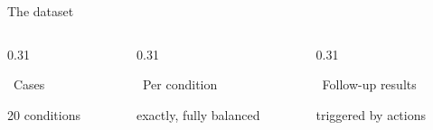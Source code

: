 \documentclass[aspectratio=169,t]{beamer}
\begin{document}
\begin{frame}{The dataset}
  \begin{columns}[T,onlytextwidth]
    \begin{column}{0.31\textwidth}
      \begin{block}{{\color{CERNblue}\faLayerGroup}\;\, Cases}
        \centering

        \vspace{0.3mm}
        {\footnotesize 20 conditions}
      \end{block}
    \end{column}%
    \hfill
    \begin{column}{0.31\textwidth}
      \begin{alertblock}{{\color{CERNorange}\faBalanceScale}\;\, Per condition}
        \centering

        \vspace{0.3mm}
        {\footnotesize exactly, fully balanced}
      \end{alertblock}
    \end{column}%
    \hfill
    \begin{column}{0.31\textwidth}
      \begin{exampleblock}{{\color{CERNcyan}\faDatabase}\;\, Follow-up results}
        \centering

        \vspace{0.3mm}
        {\footnotesize triggered by actions}
      \end{exampleblock}
    \end{column}
  \end{columns}


\end{frame}
\end{document}
